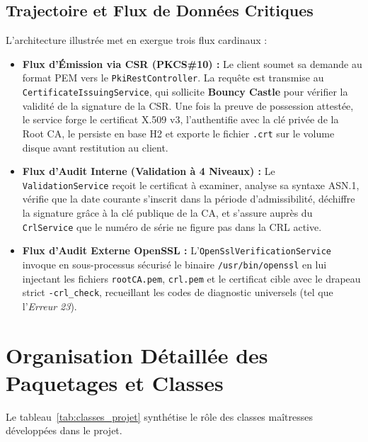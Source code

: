 \documentclass[12pt,a4paper]{report}
\begin{document}
\subsection{Trajectoire et Flux de Données Critiques}
L'architecture illustrée met en exergue trois flux cardinaux :
\begin{itemize}
    \item \textbf{Flux d'Émission via CSR (PKCS\#10) :} Le client soumet sa demande au format PEM vers le \texttt{PkiRestController}. La requête est transmise au \texttt{CertificateIssuingService}, qui sollicite \textbf{Bouncy Castle} pour vérifier la validité de la signature de la CSR. Une fois la preuve de possession attestée, le service forge le certificat X.509 v3, l'authentifie avec la clé privée de la Root CA, le persiste en base H2 et exporte le fichier \texttt{.crt} sur le volume disque avant restitution au client.
    \item \textbf{Flux d'Audit Interne (Validation à 4 Niveaux) :} Le \texttt{ValidationService} reçoit le certificat à examiner, analyse sa syntaxe ASN.1, vérifie que la date courante s'inscrit dans la période d'admissibilité, déchiffre la signature grâce à la clé publique de la CA, et s'assure auprès du \texttt{CrlService} que le numéro de série ne figure pas dans la CRL active.
    \item \textbf{Flux d'Audit Externe OpenSSL :} L'\texttt{OpenSslVerificationService} invoque en sous-processus sécurisé le binaire \texttt{/usr/bin/openssl} en lui injectant les fichiers \texttt{rootCA.pem}, \texttt{crl.pem} et le certificat cible avec le drapeau strict \texttt{-crl\_check}, recueillant les codes de diagnostic universels (tel que l'\textit{Erreur 23}).
\end{itemize}

\section{Organisation Détaillée des Paquetages et Classes}
Le tableau~\ref{tab:classes_projet} synthétise le rôle des classes maîtresses développées dans le projet.
\end{document}
